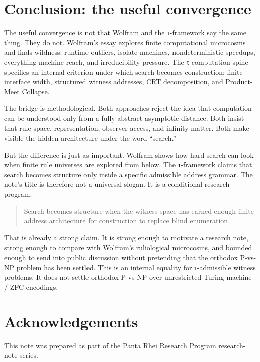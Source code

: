 \documentclass{pantarhei-researchnote}
\begin{document}
\onecolumn
\section{Conclusion: the useful convergence}
\label{sec:conclusion}

The useful convergence is not that Wolfram and the τ-framework say the
same thing. They do not. Wolfram's essay explores finite computational
microcosms and finds wildness: runtime outliers, isolate machines,
nondeterministic speedups, everything-machine reach, and irreducibility
pressure. The τ computation spine specifies an internal criterion under
which search becomes construction: finite interface width, structured
witness addresses, CRT decomposition, and Product-Meet Collapse.

The bridge is methodological. Both approaches reject the idea that
computation can be understood only from a fully abstract asymptotic
distance. Both insist that rule space, representation, observer access,
and infinity matter. Both make visible the hidden architecture under the
word ``search.''

But the difference is just as important. Wolfram shows how hard search can
look when finite rule universes are explored from below. The τ-framework
claims that search becomes structure only inside a specific admissible
address grammar. The note's title is therefore not a universal slogan. It
is a conditional research program:

\begin{quote}\small
Search becomes structure when the witness space has earned enough finite
address architecture for construction to replace blind enumeration.
\end{quote}

That is already a strong claim. It is strong enough to motivate a research
note, strong enough to compare with Wolfram's ruliological microcosms, and
bounded enough to send into public discussion without pretending that the
orthodox P-vs-NP problem has been settled.
This is an internal equality for τ-admissible witness problems. It does
not settle orthodox P vs NP over unrestricted Turing-machine / ZFC
encodings.

\section*{Acknowledgements}
\label{sec:ack}

This note was prepared as part of the Panta Rhei Research Program
research-note series.



\end{document}
